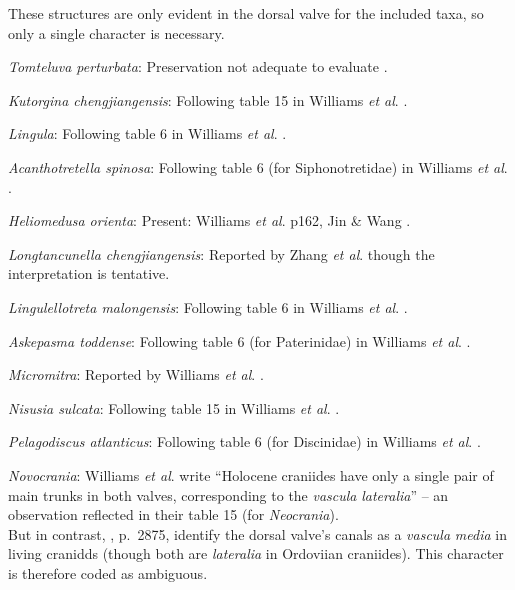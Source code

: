 \documentclass[]{book}
\theoremstyle{definition}
\theoremstyle{definition}
\theoremstyle{definition}
\theoremstyle{remark}
\begin{document}
These structures are only evident in the dorsal valve for the included
taxa, so only a single character is necessary.

\emph{Tomteluva perturbata}: Preservation not adequate to evaluate
\citep{Streng2016Anew}.

\emph{Kutorgina chengjiangensis}: Following table 15 in Williams
\emph{et al}. \citeyearpar{Williams2000BrachiopodaLinguliformea}.

\emph{Lingula}: Following table 6 in Williams \emph{et al}.
\citeyearpar{Williams2000BrachiopodaLinguliformea}.

\emph{Acanthotretella spinosa}: Following table 6 (for Siphonotretidae)
in Williams \emph{et al}.
\citeyearpar{Williams2000BrachiopodaLinguliformea}.

\emph{Heliomedusa orienta}: Present: Williams \emph{et al}.
\citeyearpar{Williams2000BrachiopodaLinguliformea} p162, Jin \& Wang
\citeyearpar{Jin1992Revisionof}.

\emph{Longtancunella chengjiangensis}: Reported by Zhang \emph{et al}.
\citeyearpar{Zhang2007Agregarious} though the interpretation is
tentative.

\emph{Lingulellotreta malongensis}: Following table 6 in Williams
\emph{et al}. \citeyearpar{Williams2000BrachiopodaLinguliformea}.

\emph{Askepasma toddense}: Following table 6 (for Paterinidae) in
Williams \emph{et al}.
\citeyearpar{Williams2000BrachiopodaLinguliformea}.

\emph{Micromitra}: Reported by Williams \emph{et al}.
\citeyearpar{Williams1998Thediversity}.

\emph{Nisusia sulcata}: Following table 15 in Williams \emph{et al}.
\citeyearpar{Williams2000BrachiopodaLinguliformea}.

\emph{Pelagodiscus atlanticus}: Following table 6 (for Discinidae) in
Williams \emph{et al}.
\citeyearpar{Williams2000BrachiopodaLinguliformea}.

\emph{Novocrania}: Williams \emph{et al}.
\citeyearpar{Williams2000BrachiopodaLinguliformea} write ``Holocene
craniides have only a single pair of main trunks in both valves,
corresponding to the \emph{vascula} \emph{lateralia}'' -- an observation
reflected in their table 15 (for \emph{Neocrania}).\\
But in contrast, \citet{Williams2007PartH}, p.~2875, identify the dorsal
valve's canals as a \emph{vascula} \emph{media} in living cranidds
(though both are \emph{lateralia} in Ordoviian craniides). This
character is therefore coded as ambiguous.
\end{document}
